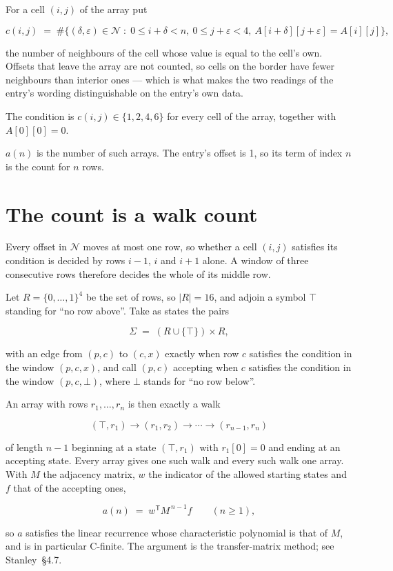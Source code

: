 \documentclass[11pt]{article}
\theoremstyle{definition}
\begin{document}
For a cell $(i,j)$ of the array put

\[c(i,j) \;=\; \#\bigl\{(\delta,\varepsilon)\in\mathcal{N} \;:\; 0\le i+\delta<n,\ 0\le j+\varepsilon<4,\ A[i+\delta][j+\varepsilon] = A[i][j]\bigr\},\]

the number of neighbours of the cell whose value is equal to the cell's own. Offsets that leave the array are not counted, so cells on the border have fewer neighbours than interior ones --- which is what makes the two readings of the entry's wording distinguishable on the entry's own data.

The condition is $c(i,j) \in \{1, 2, 4, 6\}$ for every cell of the array, together with $A[0][0]=0$.

$a(n)$ is the number of such arrays. The entry's offset is 1, so its term of index $n$ is the count for $n$ rows.

\section{The count is a walk count}

Every offset in $\mathcal{N}$ moves at most one row, so whether a cell $(i,j)$ satisfies its condition is decided by rows $i-1$, $i$ and $i+1$ alone. A window of three consecutive rows therefore decides the whole of its middle row.

Let $R = \{0,\dots,1\}^{4}$ be the set of rows, so $|R| = 16$, and adjoin a symbol $\top$ standing for ``no row above''. Take as states the pairs

\[\Sigma \;=\; (R \cup \{\top\}) \times R,\]

with an edge from $(p,c)$ to $(c,x)$ exactly when row $c$ satisfies the condition in the window $(p,c,x)$, and call $(p,c)$ accepting when $c$ satisfies the condition in the window $(p,c,\bot)$, where $\bot$ stands for ``no row below''.

An array with rows $r_1,\dots,r_n$ is then exactly a walk

\[(\top,r_1) \to (r_1,r_2) \to \cdots \to (r_{n-1},r_n)\]

of length $n-1$ beginning at a state $(\top,r_1)$ with $r_1[0]=0$ and ending at an accepting state. Every array gives one such walk and every such walk one array. With $M$ the adjacency matrix, $w$ the indicator of the allowed starting states and $f$ that of the accepting ones,

\[a(n) \;=\; w^{\mathsf T} M^{\,n-1} f \qquad (n \ge 1),\]

so $a$ satisfies the linear recurrence whose characteristic polynomial is that of $M$, and is in particular C-finite. The argument is the transfer-matrix method; see Stanley~\S4.7.
\end{document}
